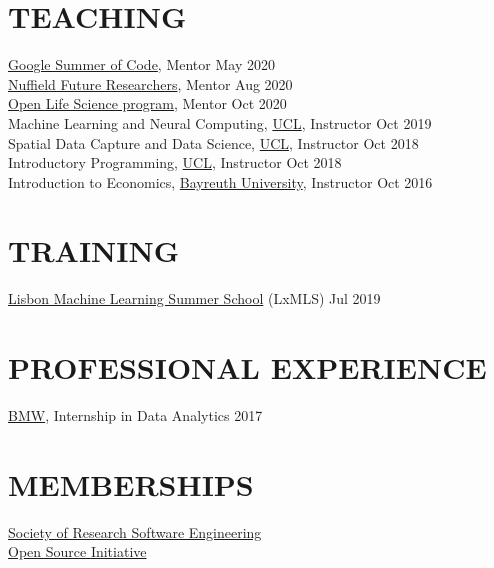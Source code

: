 \documentclass{cv}
\begin{document}
\section{TEACHING}

\href{https://summerofcode.withgoogle.com/archive/2020/projects/6262209727954944/}{Google Summer of Code}, Mentor \hfill May 2020 \\

\href{https://www.nuffieldfoundation.org/students-teachers/nuffield-future-researchers}{Nuffield Future Researchers}, Mentor \hfill Aug 2020 \\

\href{https://openlifesci.org}{Open Life Science program}, Mentor \hfill Oct 2020 \\

Machine Learning and Neural Computing, \href{https://www.ucl.ac.uk/}{UCL}, Instructor \hfill Oct 2019 \\

Spatial Data Capture and Data Science, \href{https://www.ucl.ac.uk/}{UCL}, Instructor \hfill Oct 2018 \\

Introductory Programming, \href{https://www.ucl.ac.uk/}{UCL}, Instructor \hfill Oct 2018 \\

Introduction to Economics, \href{https://www.uni-bayreuth.de/en/}{Bayreuth University}, Instructor \hfill Oct 2016 \\

\section{TRAINING}

\href{http://lxmls.it.pt/}{Lisbon Machine Learning Summer School} (LxMLS) \hfill Jul 2019 \\


\section{PROFESSIONAL EXPERIENCE}

\href{https://www.bmw.com/en/index.html}{BMW}, Internship in Data Analytics  \hfill 2017 



\section{MEMBERSHIPS}

\href{https://society-rse.org/}{Society of Research Software Engineering} \\

\href{http://opensource.org}{Open Source Initiative}
\end{document}
